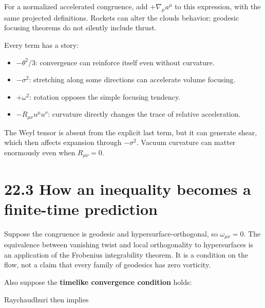\documentclass[
  11pt,
  letterpaper,
  oneside,
  openany]{scrbook}
\providecommand{\tightlist}{%
  \setlength{\itemsep}{0pt}\setlength{\parskip}{0pt}}
\begin{document}
For a normalized accelerated congruence, add \(+\nabla_\mu a^\mu\) to
this expression, with the same projected definitions. Rockets can alter
the cloud\textquotesingle s behavior; geodesic focusing theorems do not
silently include thrust.

Every term has a story:

\begin{itemize}
\tightlist
\item
  \(-\theta^2/3\): convergence can reinforce itself even without
  curvature.
\item
  \(-\sigma^2\): stretching along some directions can accelerate volume
  focusing.
\item
  \(+\omega^2\): rotation opposes the simple focusing tendency.
\item
  \(-R_{\mu\nu}u^\mu u^\nu\): curvature directly changes the trace of
  relative acceleration.
\end{itemize}

The Weyl tensor is absent from the explicit last term, but it can
generate shear, which then affects expansion through \(-\sigma^2\).
Vacuum curvature can matter enormously even when \(R_{\mu\nu}=0\).

\hypertarget{how-an-inequality-becomes-a-finite-time-prediction}{%
\section{22.3 How an inequality becomes a finite-time
prediction}\label{how-an-inequality-becomes-a-finite-time-prediction}}

Suppose the congruence is geodesic and hypersurface-orthogonal, so
\(\omega_{\mu\nu}=0\). The equivalence between vanishing twist and local
orthogonality to hypersurfaces is an application of the Frobenius
integrability theorem. It is a condition on the flow, not a claim that
every family of geodesics has zero vorticity.

Also suppose the \textbf{timelike convergence condition} holds:

\begin{center}
\begingroup
{}
\ifdim\wd\grmathbox>\linewidth
\resizebox{\linewidth}{!}{\usebox{\grmathbox}}
\else\usebox{\grmathbox}\fi
\endgroup
\end{center}

Raychaudhuri then implies

\begin{center}
\begingroup
{}
\ifdim\wd\grmathbox>\linewidth
\resizebox{\linewidth}{!}{\usebox{\grmathbox}}
\else\usebox{\grmathbox}\fi
\endgroup
\end{center}
\end{document}
